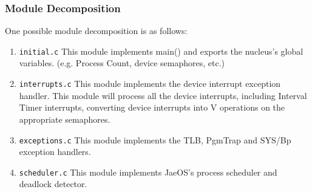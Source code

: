 \subsubsection{Module Decomposition}
	One possible module decomposition is as follows:
\begin{enumerate}
	\item{\verb+initial.c+}
	This module implements main() and exports the nucleus's global
variables. (e.g. Process Count, device semaphores, etc.)
	\item{\verb+interrupts.c+} This module implements the device interrupt exception
	handler. This module will process all the device interrupts, including Interval Timer interrupts, converting device interrupts into V operations on
	the appropriate semaphores.
\item{\verb+exceptions.c+}
	This module implements the TLB, PgmTrap and SYS/Bp
	exception handlers.
\item{\verb+scheduler.c+}
	This module implements JaeOS's process scheduler and deadlock detector.
\end{enumerate}
